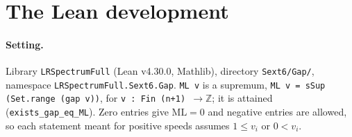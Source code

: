 \documentclass[11pt]{article}
\theoremstyle{definition}
\theoremstyle{remark}
\newcommand{\ML}{\mathrm{ML}}
\newcommand{\ZZ}{\mathbb{Z}}
\begin{document}
\section{The Lean development}\label{sec:lean}

\paragraph{Setting.}
Library \texttt{LRSpectrumFull} (Lean v4.30.0, Mathlib), directory \texttt{Sext6/Gap/}, namespace \texttt{LRSpectrumFull.Sext6.Gap}. \texttt{ML v} is a supremum, \texttt{ML v = sSup (Set.range (gap v))}, for \texttt{v : Fin (n+1) $\to\ZZ$}; it is attained (\texttt{exists\_gap\_eq\_ML}). Zero entries give $\ML=0$ and negative entries are allowed, so each statement meant for positive speeds assumes $1\le v_i$ or $0<v_i$.
\end{document}
